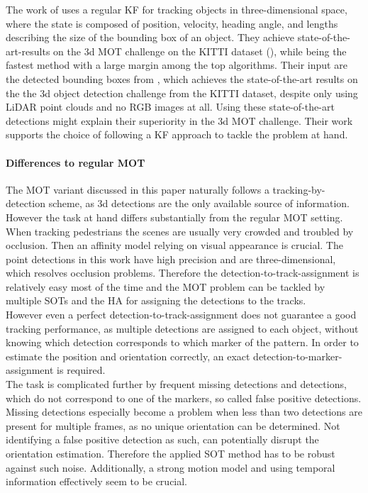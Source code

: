 \documentclass[12pt,a4paper]{article}
\begin{document}
The work of \cite{3d_kalman}  uses a regular KF for tracking objects in three-dimensional space, where the state is composed of position, velocity, heading angle, and lengths describing the size of the bounding box of an object. They achieve state-of-the-art-results on the 3d MOT challenge on the KITTI dataset (\cite{kitti}), while being the fastest method with a large margin among the top algorithms. Their input are the detected bounding boxes from \cite{PointRCNN}, which achieves the state-of-the-art results on the the 3d object detection challenge from the KITTI dataset, despite only using LiDAR point clouds and no RGB images at all. Using these state-of-the-art detections might explain their superiority in the 3d MOT challenge. Their work supports the choice of following a KF approach to tackle the problem at hand.

\paragraph{Differences to regular MOT} The MOT variant discussed in this paper naturally follows a tracking-by-detection scheme, as 3d detections are the only available source of information. However the task at hand differs substantially from the regular MOT setting. When tracking pedestrians the scenes are usually very crowded and troubled by occlusion. Then an affinity model relying on visual appearance is crucial. The point detections in this work have high precision and are three-dimensional, which resolves occlusion problems. Therefore the detection-to-track-assignment is relatively easy most of the time and the MOT problem can be tackled by multiple SOTs and the HA for assigning the detections to the tracks.\\
 However even a perfect detection-to-track-assignment does not guarantee a good tracking performance, as multiple detections are assigned to each object, without knowing which detection corresponds to which marker of the pattern. In order to estimate the position and orientation correctly, an exact detection-to-marker-assignment is required.\\
The task is complicated further by frequent missing detections and detections, which do not correspond to one of the markers, so called false positive detections. Missing detections especially become a problem when less than two detections are present for multiple frames, as no unique orientation can be determined. Not identifying a false positive detection as such, can potentially disrupt the orientation estimation. Therefore the applied SOT method has to be  robust against such noise. Additionally, a strong motion model and using temporal information effectively seem to be crucial. \\
\end{document}
